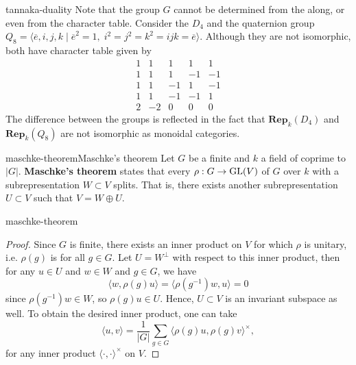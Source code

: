 \begin{example}{tannaka-duality}
    Note that the group $G$ cannot be determined from the  along, or even from the character table. Consider the  $D_4$ and the quaternion group $Q_8 = \langle \overline{e}, i, j, k \mid \overline{e}^2 = 1, \; i^2 = j^2 = k^2 = ijk = \overline{e} \rangle$. Although they are not isomorphic, both have character table given by
    \[ \begin{array}{c|c|c|c|c}
        1 & 1 & 1 & 1 & 1 \\ \hline
        1 & 1 & 1 & -1 & -1 \\ \hline
        1 & 1 & -1 & 1 & -1 \\ \hline
        1 & 1 & -1 & -1 & 1 \\ \hline
        2 & -2 & 0 & 0 & 0
    \end{array} \]
    The difference between the groups is reflected in the fact that $\textbf{Rep}_k(D_4)$ and $\textbf{Rep}_k(Q_8)$ are not isomorphic as monoidal categories.
\end{example}

\begin{topic}{maschke-theorem}{Maschke's theorem}
    Let $G$ be a finite  and $k$ a field of  coprime to $|G|$. \textbf{Maschke's theorem} states that every  $\rho : G \to \textup{GL}(V)$ of $G$ over $k$ with a subrepresentation $W \subset V$ splits. That is, there exists another subrepresentation $U \subset V$ such that $V = W \oplus U$.
\end{topic}

\begin{example}{maschke-theorem}
    \begin{proof}
        Since $G$ is finite, there exists an inner product on $V$ for which $\rho$ is unitary, i.e. $\rho(g)$ is  for all $g \in G$. Let $U = W^\perp$ with respect to this inner product, then for any $u \in U$ and $w \in W$ and $g \in G$, we have
        \[ \langle w, \rho(g) u \rangle = \langle \rho(g^{-1}) w, u \rangle = 0 \]
        since $\rho(g^{-1}) w \in W$, so $\rho(g) u \in U$. Hence, $U \subset V$ is an invariant subspace as well. To obtain the desired inner product, one can take
        \[ \langle u, v \rangle = \frac{1}{|G|} \sum_{g \in G} \langle \rho(g) u, \rho(g) v \rangle^\times , \]
        for any inner product $\langle \cdot, \cdot \rangle^\times$ on $V$.
    \end{proof}
\end{example}

